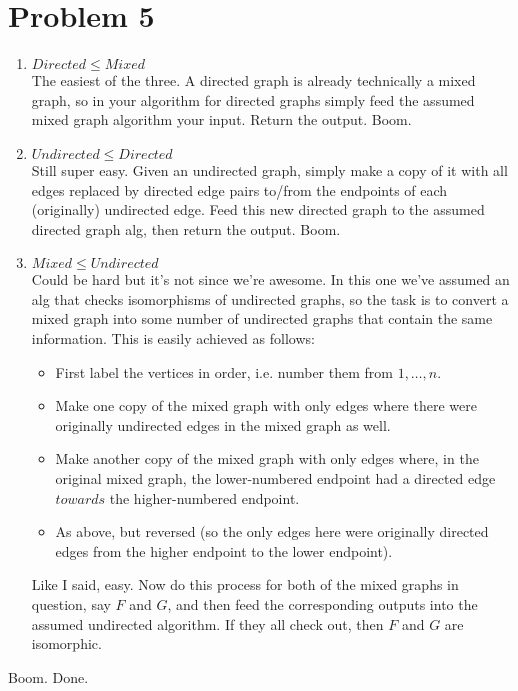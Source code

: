 \documentclass{article}
\providecommand{\prob}[1]{\section*{Problem #1}}
\begin{document}
\prob{5}
\begin{enumerate}
  \item $Directed \leq Mixed$\\
        The easiest of the three. A directed graph is already technically a mixed graph, so in your algorithm for directed graphs simply feed the assumed mixed graph algorithm your input. Return the output. Boom.
  \item $Undirected \leq Directed$\\
        Still super easy. Given an undirected graph, simply make a copy of it with all edges replaced by directed edge pairs to/from the endpoints of each (originally) undirected edge. Feed this new directed graph to the assumed directed graph alg, then return the output. Boom.
  \item $Mixed \leq Undirected$\\
        Could be hard but it's not since we're awesome. In this one we've assumed an alg that checks isomorphisms of undirected graphs, so the task is to convert a mixed graph into some number of undirected graphs that contain the same information. This is easily achieved as follows:
        \begin{itemize}
          \item First label the vertices in order, i.e. number them from $1,\dots,n$.
          \item Make one copy of the mixed graph with only edges where there were originally undirected edges in the mixed graph as well.
          \item Make another copy of the mixed graph with only edges where, in the original mixed graph, the lower-numbered endpoint had a directed edge $towards$ the higher-numbered endpoint.
          \item As above, but reversed (so the only edges here were originally directed edges from the higher endpoint to the lower endpoint).
        \end{itemize}
        Like I said, easy. Now do this process for both of the mixed graphs in question, say $F$ and $G$, and then feed the corresponding outputs into the assumed undirected algorithm. If they all check out, then $F$ and $G$ are isomorphic.
\end{enumerate}
Boom. Done.
\end{document}
